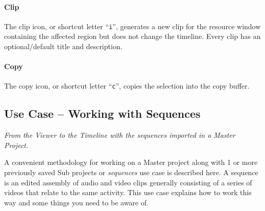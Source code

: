 \paragraph{Clip} The clip icon, or shortcut letter “\texttt{i}”,
generates a new clip for the resource window containing the affected
region but does not change the timeline.  Every clip has an
optional/default title and description.

\paragraph{Copy} The copy icon, or shortcut letter “\texttt{c}”,
copies the selection into the copy buffer.

\subsection{Use Case – Working with Sequences}
\label{sub:use_case_working_sequences}

\textit{From the Viewer to the Timeline with the sequences imported
  in a Master Project.}

A convenient methodology for working on a Master project along with
1 or more previously saved Sub projects or \textit{sequences} use
case is described here.  A sequence is an edited assembly of audio
and video clips generally consisting of a series of videos that
relate to the same activity. This use case explains how to work this
way and some things you need to be aware of.

